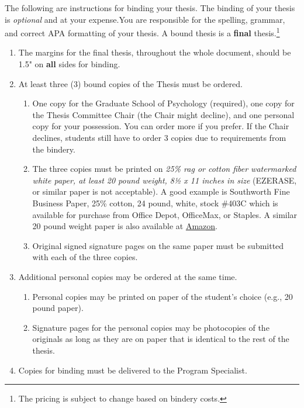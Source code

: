 \documentclass[
  openany]{book}
\providecommand{\tightlist}{%
  \setlength{\itemsep}{0pt}\setlength{\parskip}{0pt}}
\begin{document}
The following are instructions for binding your thesis. The binding of your thesis is \emph{optional} and at your expense.You are responsible for the spelling, grammar, and correct APA formatting of your thesis. A bound thesis is a \textbf{final} thesis.\footnote{The pricing is subject to change based on bindery costs.}

\begin{enumerate}
\def\labelenumi{\arabic{enumi}.}
\item
  The margins for the final thesis, throughout the whole document, should be 1.5" on \textbf{all} sides for binding.
\item
  At least three (3) bound copies of the Thesis must be ordered.

  \begin{enumerate}
  \def\labelenumii{\alph{enumii}.}
  \tightlist
  \item
    One copy for the Graduate School of Psychology (required), one copy for the Thesis Committee Chair (the Chair might decline), and one personal copy for your possession. You can order more if you prefer. If the Chair declines, students still have to order 3 copies due to requirements from the bindery.
  \item
    The three copies must be printed on \emph{25\% rag or cotton fiber watermarked white paper, at least 20 pound weight, 8½ x 11 inches in size} (EZERASE, or similar paper is not acceptable). A good example is Southworth Fine Business Paper, 25\% cotton, 24 pound, white, stock \#403C which is available for purchase from Office Depot, OfficeMax, or Staples. A similar 20 pound weight paper is also available at \href{https://www.amazon.com/Southworth-Business-Cotton-Sheets-403C/dp/B00006IE2G/ref=sr_1_1?dchild=1\&keywords=southworth+fine+business+paper+\%23403c\&qid=1590377859\&sr=8-1}{Amazon}.
  \item
    Original signed signature pages on the same paper must be submitted with each of the three copies.
  \end{enumerate}
\item
  Additional personal copies may be ordered at the same time.

  \begin{enumerate}
  \def\labelenumii{\alph{enumii}.}
  \tightlist
  \item
    Personal copies may be printed on paper of the student's choice (e.g., 20 pound paper).
  \item
    Signature pages for the personal copies may be photocopies of the originals as long as they are on paper that is identical to the rest of the thesis.
  \end{enumerate}
\item
  Copies for binding must be delivered to the Program Specialist.


\end{enumerate}
\end{document}
